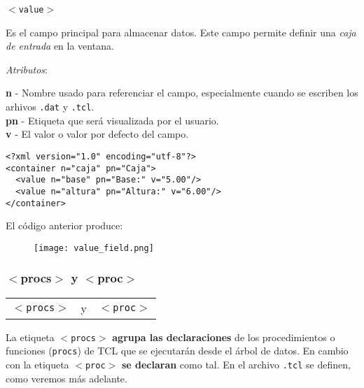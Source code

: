 \documentclass[10pt, a4paper, twocolumn]{article} %
\begin{document}
\vspace{0.20cm}
\begin{center}
	\texttt{$<$value$>$}
\end{center}
\vspace{0.20cm}

Es el campo principal para almacenar datos. Este campo permite definir una \textit{caja de entrada} en la ventana.

\vspace{0.15cm}
\textit{Atributos}:

\vspace{0.15cm}
	\textbf{n} - Nombre usado para referenciar el campo, especialmente cuando se escriben los arhivos \texttt{.dat} y \texttt{.tcl}.\\
	\textbf{pn} - Etiqueta que será visualizada por el usuario.\\
	\textbf{v} - El valor o valor por defecto del campo.\\
\vspace{0.15cm}

\lstset{language=XML} 
\begin{lstlisting}
<?xml version="1.0" encoding="utf-8"?>
<container n="caja" pn="Caja">
  <value n="base" pn="Base:" v="5.00"/>
  <value n="altura" pn="Altura:" v="6.00"/>
</container>
\end{lstlisting}


El código anterior produce:

\begin{figure}[hbtp!]
	\centering
	\texttt{[image: value\_field.png]}
\end{figure}

\subsubsection{$<$procs$>$ y $<$proc$>$ }

\vspace{0.20cm}
\begin{center}
	\begin{tabular}{rcl}
		\texttt{$<$procs$>$} &y&\texttt{$<$proc$>$}\\
	\end{tabular}
\end{center}
\vspace{0.20cm}

La etiqueta \texttt{$<$procs$>$} \textbf{agrupa las declaraciones} de los procedimientos o funciones (\texttt{procs}) de TCL que se ejecutarán desde el árbol de datos. En cambio con la etiqueta \texttt{$<$proc$>$} \textbf{se declaran} como tal. En el archivo \texttt{.tcl} se definen, como veremos más adelante.
\end{document}
